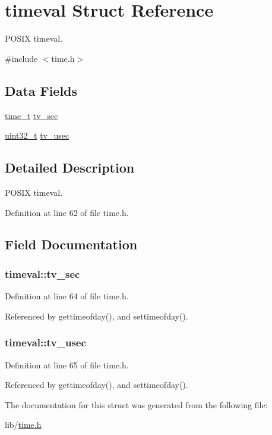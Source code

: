 \hypertarget{structtimeval}{\section{timeval Struct Reference}
\label{structtimeval}
}


P\-O\-S\-I\-X timeval.  




{\ttfamily \#include $<$time.\-h$>$}

\subsection*{Data Fields}
\begin{DoxyCompactItemize}
\item 
\hyperlink{time_8h_a3346b04b0420b32ccf6b706551b70762}{time\-\_\-t} \hyperlink{structtimeval_aef6ddab1064c430758f9f913b7e4a21e}{tv\-\_\-sec}
\item 
\hyperlink{send_8c_a435d1572bf3f880d55459d9805097f62}{uint32\-\_\-t} \hyperlink{structtimeval_a8fd7abf5420981b3ff58bb23df458587}{tv\-\_\-usec}
\end{DoxyCompactItemize}


\subsection{Detailed Description}
P\-O\-S\-I\-X timeval. 

Definition at line 62 of file time.\-h.



\subsection{Field Documentation}
\hypertarget{structtimeval_aef6ddab1064c430758f9f913b7e4a21e}{
\subsubsection[{tv\-\_\-sec}]{ timeval\-::tv\-\_\-sec}}\label{structtimeval_aef6ddab1064c430758f9f913b7e4a21e}


Definition at line 64 of file time.\-h.



Referenced by gettimeofday(), and settimeofday().

\hypertarget{structtimeval_a8fd7abf5420981b3ff58bb23df458587}{
\subsubsection[{tv\-\_\-usec}]{ timeval\-::tv\-\_\-usec}}\label{structtimeval_a8fd7abf5420981b3ff58bb23df458587}


Definition at line 65 of file time.\-h.



Referenced by gettimeofday(), and settimeofday().



The documentation for this struct was generated from the following file\-:\begin{DoxyCompactItemize}
\item 
lib/\hyperlink{time_8h}{time.\-h}\end{DoxyCompactItemize}
